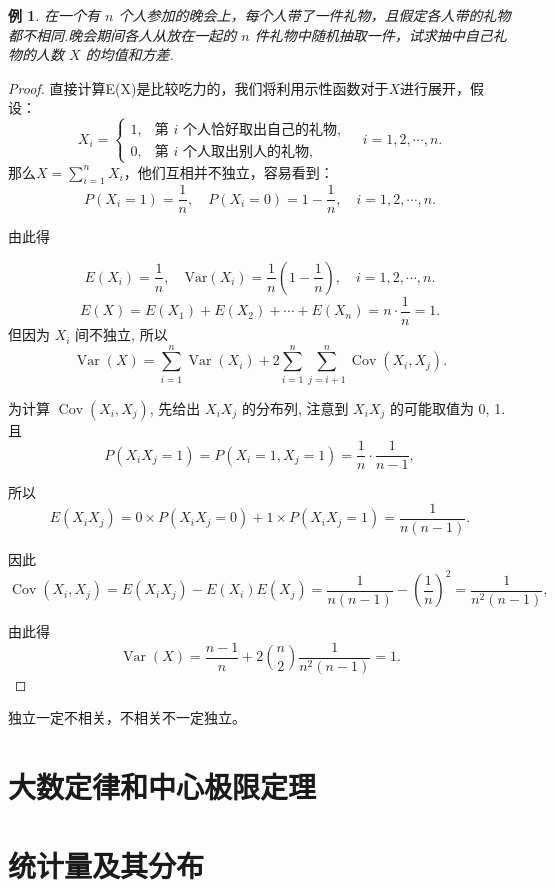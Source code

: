 \documentclass[a4paper]{ctexart}
\newtheorem{example}{例}[section]
\begin{document}
\begin{example}
    在一个有 \(n\) 个人参加的晚会上，每个人带了一件礼物，且假定各人带的礼物都不相同.晚会期间各人从放在一起的 \(n\) 件礼物中随机抽取一件，试求抽中自己礼物的人数 \(X\) 的均值和方差.
\end{example}
\begin{proof}
    直接计算E(X)是比较吃力的，我们将利用示性函数对于$X$进行展开，假设：
    \[
    X_i = \begin{cases} 
    1, & \text{第 } i \text{ 个人恰好取出自己的礼物}, \\ 
    0, & \text{第 } i \text{ 个人取出别人的礼物}, 
    \end{cases} 
    \quad i = 1, 2, \cdots, n.
    \]
    那么$X=\sum_{i=1}^n X_i$，他们互相并不独立，容易看到：
    \[
    P(X_i = 1) = \frac{1}{n}, \quad P(X_i = 0) = 1 - \frac{1}{n}, \quad i = 1, 2, \cdots, n.
    \]

    由此得

    \[
    E(X_i) = \frac{1}{n}, \quad \text{Var}(X_i) = \frac{1}{n} \left( 1 - \frac{1}{n} \right), \quad i = 1, 2, \cdots, n.
    \]
    \[
    E(X) = E(X_1) + E(X_2) + \cdots + E(X_n) = n \cdot \frac{1}{n} = 1.
    \]
    但因为 \(X_i\) 间不独立, 所以
    \[
    \operatorname{Var}(X) = \sum_{i=1}^{n} \operatorname{Var}(X_i) + 2 \sum_{i=1}^{n} \sum_{j=i+1}^{n} \operatorname{Cov}(X_i, X_j).
    \]

    为计算 \(\operatorname{Cov}(X_i, X_j)\), 先给出 \(X_i X_j\) 的分布列, 注意到 \(X_i X_j\) 的可能取值为 0, 1. 且
    \[
    P(X_i X_j = 1) = P(X_i = 1, X_j = 1) = \frac{1}{n} \cdot \frac{1}{n-1},
    \]

    所以
    \[
    E(X_i X_j) = 0 \times P(X_i X_j = 0) + 1 \times P(X_i X_j = 1) = \frac{1}{n(n-1)}.
    \]

    因此
    \[
    \operatorname{Cov}(X_i, X_j) = E(X_i X_j) - E(X_i)E(X_j) = \frac{1}{n(n-1)} - \left( \frac{1}{n} \right)^2 = \frac{1}{n^2(n-1)},
    \]

    由此得
    \[
    \operatorname{Var}(X) = \frac{n-1}{n} + 2 \binom{n}{2} \frac{1}{n^2(n-1)} = 1.
    \]
\end{proof}
\begin{tipbox}
    独立一定不相关，不相关不一定独立。
\end{tipbox}
\section{大数定律和中心极限定理}

\section{统计量及其分布}
\end{document}
